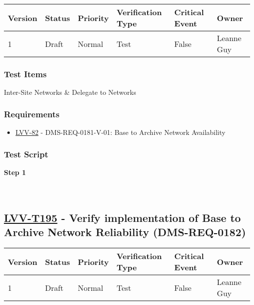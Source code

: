 \begin{longtable}[]{@{}llllll@{}}
\toprule
Version & Status & Priority & Verification Type & Critical Event &
Owner\tabularnewline
\midrule
\endhead
1 & Draft & Normal & Test & False & Leanne Guy\tabularnewline
\bottomrule
\end{longtable}

\hypertarget{test-items-170}{%
\subsubsection{Test Items}\label{test-items-170}}

Inter-Site Networks \& Delegate to Networks

\hypertarget{requirements-171}{%
\subsubsection{Requirements}\label{requirements-171}}

\begin{itemize}
\tightlist
\item
  \href{https://jira.lsstcorp.org/browse/LVV-82}{LVV-82} -
  DMS-REQ-0181-V-01: Base to Archive Network Availability
\end{itemize}

\hypertarget{test-script-171}{%
\subsubsection{Test Script}\label{test-script-171}}

\textbf{Step 1}\\
~\\
~\\

\hypertarget{lvv-t195---verify-implementation-of-base-to-archive-network-reliability-dms-req-0182}{%
\subsection{\texorpdfstring{\href{https://jira.lsstcorp.org/secure/Tests.jspa\#/testCase/LVV-T195}{LVV-T195}
- Verify implementation of Base to Archive Network Reliability
(DMS-REQ-0182)}{LVV-T195 - Verify implementation of Base to Archive Network Reliability (DMS-REQ-0182)}}\label{lvv-t195---verify-implementation-of-base-to-archive-network-reliability-dms-req-0182}}

\begin{longtable}[]{@{}llllll@{}}
\toprule
Version & Status & Priority & Verification Type & Critical Event &
Owner\tabularnewline
\midrule
\endhead
1 & Draft & Normal & Test & False & Leanne Guy\tabularnewline
\bottomrule
\end{longtable}

